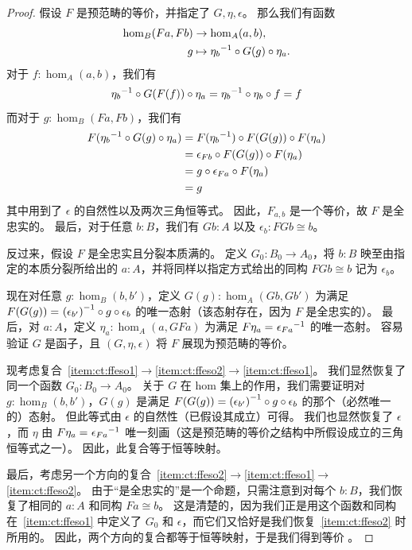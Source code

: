 \begin{proof}
  假设 $F$ 是预范畴的等价，并指定了 $G,\eta,\epsilon$。
  那么我们有函数
  \begin{align*}
      \hom_B(Fa,Fb) &\to \hom_A(a,b),\\
      g &\mapsto {\eta_b}^{-1}\circ G(g)\circ \eta_a.
  \end{align*}
  对于 $f:\hom_A(a,b)$，我们有
  \[ {\eta_{b}}^{-1}\circ G(F(f))\circ \eta_{a}  =
  {\eta_{b}}^{-1} \circ \eta_{b} \circ f=
  f
  \]
  而对于 $g:\hom_B(Fa,Fb)$，我们有
  \begin{align*}
    F({\eta_b}^{-1} \circ G(g)\circ\eta_a)
    &= F({\eta_b}^{-1})\circ F(G(g))\circ F(\eta_a)\\
    &= \epsilon_{Fb}\circ F(G(g))\circ F(\eta_a)\\
    &= g\circ\epsilon_{Fa}\circ F(\eta_a)\\
    &= g
  \end{align*}
  其中用到了 $\epsilon$ 的自然性以及两次三角恒等式。
  因此，$F_{a,b}$ 是一个等价，故 $F$ 是全忠实的。
  最后，对于任意 $b:B$，我们有 $Gb:A$ 以及 $\epsilon_b:FGb\cong b$。

  反过来，假设 $F$ 是全忠实且分裂本质满的。
  定义 $G_0:B_0\to A_0$，将 $b:B$ 映至由指定的本质分裂所给出的 $a:A$，并将同样以指定方式给出的同构 $FGb\cong b$ 记为 $\epsilon_b$。

  现在对任意 $g:\hom_B(b,b')$，定义 $G(g):\hom_A(Gb,Gb')$ 为满足 $F(G(g)) =_{} {(\epsilon_{b'})}^{-1}\circ g \circ \epsilon_b $ 的唯一态射（该态射存在，因为 $F$ 是全忠实的）。
  最后，对 $a:A$，定义 $\eta_a:\hom_A(a,GFa)$ 为满足 $F\eta_a =_{} {\epsilon_{Fa}}^{-1}$ 的唯一态射。
  容易验证 $G$ 是函子，且 $(G,\eta,\epsilon)$ 将 $F$ 展现为预范畴的等价。

  现考虑复合~\ref{item:ct:ffeso1}$\to$\ref{item:ct:ffeso2}$\to$\ref{item:ct:ffeso1}。
  我们显然恢复了同一个函数 $G_0:B_0 \to A_0$。
  关于 $G$ 在 hom 集上的作用，我们需要证明对 $g:\hom_B(b,b')$，$G(g)$ 是满足 $F(G(g)) = {(\epsilon_{b'})}^{-1}\circ g \circ \epsilon_b$ 的那个（必然唯一的）态射。
  但此等式由 $\epsilon$ 的自然性（已假设其成立）可得。
  我们也显然恢复了 $\epsilon$，而 $\eta$ 由 $F\eta_a =_{} {\epsilon_{Fa}}^{-1}$ 唯一刻画（这是预范畴的等价之结构中所假设成立的三角恒等式之一）。
  因此，此复合等于恒等映射。

  最后，考虑另一个方向的复合~\ref{item:ct:ffeso2}$\to$\ref{item:ct:ffeso1}$\to$\ref{item:ct:ffeso2}。
  由于``是全忠实的''是一个命题，只需注意到对每个 $b:B$，我们恢复了相同的 $a:A$ 和同构 $Fa \cong b$。
  这是清楚的，因为我们正是用这个函数和同构在~\ref{item:ct:ffeso1} 中定义了 $G_0$ 和 $\epsilon$，而它们又恰好是我们恢复~\ref{item:ct:ffeso2} 时所用的。
  因此，两个方向的复合都等于恒等映射，于是我们得到等价 \eqv{\text{\ref{item:ct:ffeso1}}}{\text{\ref{item:ct:ffeso2}}}。
\end{proof}

